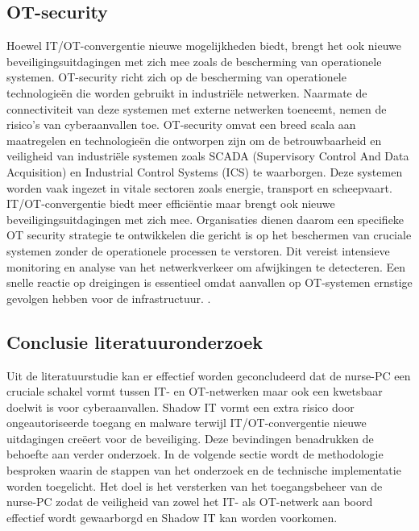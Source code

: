 \subsection{OT-security}
Hoewel IT/OT-convergentie nieuwe mogelijkheden biedt, brengt het ook nieuwe beveiligingsuitdagingen met zich mee zoals de bescherming van operationele systemen.
OT-security richt zich op de bescherming van operationele technologieën die worden gebruikt in industriële netwerken. Naarmate de connectiviteit van deze systemen 
met externe netwerken toeneemt, nemen de risico’s van cyberaanvallen toe. OT-security omvat een breed scala aan maatregelen en technologieën die ontworpen zijn om 
de betrouwbaarheid en veiligheid van industriële systemen zoals SCADA (Supervisory Control And Data Acquisition) en Industrial Control Systems (ICS) te waarborgen. Deze systemen worden vaak ingezet in vitale 
sectoren zoals energie, transport en scheepvaart. IT/OT-convergentie biedt meer efficiëntie maar brengt ook nieuwe 
beveiligingsuitdagingen met zich mee. Organisaties dienen daarom een specifieke OT security strategie te ontwikkelen die gericht is op het beschermen van cruciale systemen 
zonder de operationele processen te verstoren. Dit vereist intensieve monitoring en analyse van het netwerkverkeer om afwijkingen te detecteren. 
Een snelle reactie op dreigingen is essentieel omdat aanvallen op OT-systemen ernstige gevolgen hebben voor de infrastructuur. \autocite{Nomios2024}.

\subsection{Conclusie literatuuronderzoek}
Uit de literatuurstudie kan er effectief worden geconcludeerd dat de nurse-PC een cruciale schakel vormt tussen IT- en OT-netwerken maar ook een kwetsbaar doelwit is voor cyberaanvallen. 
Shadow IT vormt een extra risico door ongeautoriseerde toegang en malware terwijl IT/OT-convergentie nieuwe uitdagingen creëert voor de beveiliging. 
Deze bevindingen benadrukken de behoefte aan verder onderzoek. In de volgende sectie wordt de methodologie besproken waarin de stappen van het onderzoek 
en de technische implementatie worden toegelicht. Het doel is het versterken van het toegangsbeheer van de nurse-PC zodat de veiligheid van zowel het IT- als OT-netwerk aan boord 
effectief wordt gewaarborgd en Shadow IT kan worden voorkomen.



